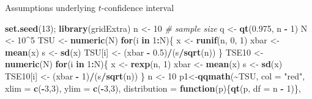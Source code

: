 \documentclass[
  ignorenonframetext,
]{beamer}
\newenvironment{Shaded}{\begin{snugshade}}{\end{snugshade}}
\newcommand{\AttributeTok}[1]{\textcolor[rgb]{0.13,0.29,0.53}{#1}}
\newcommand{\CommentTok}[1]{\textcolor[rgb]{0.56,0.35,0.01}{\textit{#1}}}
\newcommand{\ControlFlowTok}[1]{\textcolor[rgb]{0.13,0.29,0.53}{\textbf{#1}}}
\newcommand{\DecValTok}[1]{\textcolor[rgb]{0.00,0.00,0.81}{#1}}
\newcommand{\FloatTok}[1]{\textcolor[rgb]{0.00,0.00,0.81}{#1}}
\newcommand{\FunctionTok}[1]{\textcolor[rgb]{0.13,0.29,0.53}{\textbf{#1}}}
\newcommand{\NormalTok}[1]{#1}
\newcommand{\OtherTok}[1]{\textcolor[rgb]{0.56,0.35,0.01}{#1}}
\newcommand{\SpecialCharTok}[1]{\textcolor[rgb]{0.81,0.36,0.00}{\textbf{#1}}}
\newcommand{\StringTok}[1]{\textcolor[rgb]{0.31,0.60,0.02}{#1}}
\begin{document}
\begin{frame}[fragile]{Assumptions underlying \(t\)-confidence interval}
\protect\hypertarget{assumptions-underlying-t-confidence-interval-5}{}
\tiny

\begin{Shaded}
\begin{Highlighting}[]
\FunctionTok{set.seed}\NormalTok{(}\DecValTok{13}\NormalTok{); }\FunctionTok{library}\NormalTok{(gridExtra)}
\NormalTok{n }\OtherTok{\textless{}{-}} \DecValTok{10}           \CommentTok{\# sample size}
\NormalTok{q }\OtherTok{\textless{}{-}} \FunctionTok{qt}\NormalTok{(}\FloatTok{0.975}\NormalTok{, n }\SpecialCharTok{{-}} \DecValTok{1}\NormalTok{)}
\NormalTok{N }\OtherTok{\textless{}{-}} \DecValTok{10}\SpecialCharTok{\^{}}\DecValTok{5}
\NormalTok{TSU }\OtherTok{\textless{}{-}} \FunctionTok{numeric}\NormalTok{(N)}
\ControlFlowTok{for}\NormalTok{(i }\ControlFlowTok{in} \DecValTok{1}\SpecialCharTok{:}\NormalTok{N)\{}
\NormalTok{  x }\OtherTok{\textless{}{-}} \FunctionTok{runif}\NormalTok{(n, }\DecValTok{0}\NormalTok{, }\DecValTok{1}\NormalTok{)}
\NormalTok{  xbar }\OtherTok{\textless{}{-}} \FunctionTok{mean}\NormalTok{(x)}
\NormalTok{  s }\OtherTok{\textless{}{-}} \FunctionTok{sd}\NormalTok{(x)}
\NormalTok{  TSU[i] }\OtherTok{\textless{}{-}}\NormalTok{ (xbar }\SpecialCharTok{{-}} \FloatTok{0.5}\NormalTok{)}\SpecialCharTok{/}\NormalTok{(s}\SpecialCharTok{/}\FunctionTok{sqrt}\NormalTok{(n))}
\NormalTok{\}}
\NormalTok{TSE10 }\OtherTok{\textless{}{-}} \FunctionTok{numeric}\NormalTok{(N)}
\ControlFlowTok{for}\NormalTok{(i }\ControlFlowTok{in} \DecValTok{1}\SpecialCharTok{:}\NormalTok{N)\{}
\NormalTok{  x }\OtherTok{\textless{}{-}} \FunctionTok{rexp}\NormalTok{(n, }\DecValTok{1}\NormalTok{)}
\NormalTok{  xbar }\OtherTok{\textless{}{-}} \FunctionTok{mean}\NormalTok{(x)}
\NormalTok{  s }\OtherTok{\textless{}{-}} \FunctionTok{sd}\NormalTok{(x)}
\NormalTok{  TSE10[i] }\OtherTok{\textless{}{-}}\NormalTok{ (xbar }\SpecialCharTok{{-}} \DecValTok{1}\NormalTok{)}\SpecialCharTok{/}\NormalTok{(s}\SpecialCharTok{/}\FunctionTok{sqrt}\NormalTok{(n))}
\NormalTok{\}}
\NormalTok{n }\OtherTok{\textless{}{-}} \DecValTok{10}
\NormalTok{p1}\OtherTok{\textless{}{-}}\FunctionTok{qqmath}\NormalTok{(}\SpecialCharTok{\textasciitilde{}}\NormalTok{TSU, }\AttributeTok{col =} \StringTok{"red"}\NormalTok{, }\AttributeTok{xlim =} \FunctionTok{c}\NormalTok{(}\SpecialCharTok{{-}}\DecValTok{3}\NormalTok{,}\DecValTok{3}\NormalTok{), }\AttributeTok{ylim =} \FunctionTok{c}\NormalTok{(}\SpecialCharTok{{-}}\DecValTok{3}\NormalTok{,}\DecValTok{3}\NormalTok{), }\AttributeTok{distribution =} \ControlFlowTok{function}\NormalTok{(p)\{}\FunctionTok{qt}\NormalTok{(p, }\AttributeTok{df =}\NormalTok{ n }\SpecialCharTok{{-}} \DecValTok{1}\NormalTok{)\}, }

\end{Highlighting}
\end{Shaded}
\end{frame}
\end{document}
